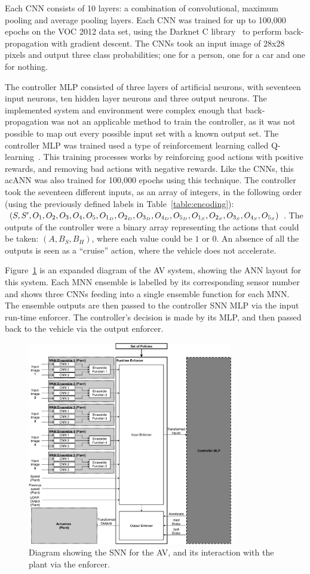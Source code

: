 Each \ac{CNN} consists of 10 layers: a combination of convolutional, maximum pooling and average pooling layers.
Each \ac{CNN} was trained for up to 100,000 epochs on the \acf{VOC} 2012 data set, using the Darknet C library~\cite{darknet13} to perform back-propagation with gradient descent.
The \acp{CNN} took an input image of 28x28 pixels and output three class probabilities; one for a person, one for a car and one for nothing.

The controller \ac{MLP} consisted of three layers of artificial neurons, with seventeen input neurons, ten hidden layer neurons and three output neurons.
The implemented system and environment were complex enough that back-propagation was not an applicable method to train the controller, as it was not possible to map out every possible input set with a known output set.
The controller \ac{MLP} was trained used a type of reinforcement learning called Q-learning~\cite{qlearning2010}.
This training processes works by reinforcing good actions with positive rewards, and removing bad actions with negative rewards.
Like the \acp{CNN}, this ac{ANN} was also trained for 100,000 epochs using this technique.
The controller took the seventeen different inputs, as an array of integers, in the following order (using the previously defined labels in Table~\ref{table:encoding}): $(S, S', O_1, O_2, O_3, O_4, O_5, O_{1_D}, O_{2_D}, O_{3_D}, O_{4_D}, O_{5_D},\\ O_{1_S}, O_{2_S}, O_{3_S}, O_{4_S}, O_{5_S})$.
The outputs of the controller were a binary array representing the actions that could be taken: $(A, B_S, B_H)$, where each value could be $1$ or $0$.
An absence of all the outputs is seen as a ``cruise'' action, where the vehicle does not accelerate.

Figure~\ref{fig:avmnn} is an expanded diagram of the \ac{AV} system, showing the \ac{ANN} layout for this system.
Each \ac{MNN} ensemble is labelled by its corresponding sensor number and shows three \acp{CNN} feeding into a single ensemble function for each \ac{MNN}.
The ensemble outputs are then passed to the controller \ac{SNN} \ac{MLP} via the input run-time enforcer.
The controller's decision is made by its \ac{MLP}, and then passed back to the vehicle via the output enforcer.

\begin{figure}[h]
	\centering
	\includegraphics[width=0.8\textwidth]{Content/fig/AV-MNN.pdf}
	\caption{Diagram showing the \ac{SNN} for the \ac{AV}, and its interaction with the plant via the enforcer. \label{fig:avmnn}}
\end{figure}

